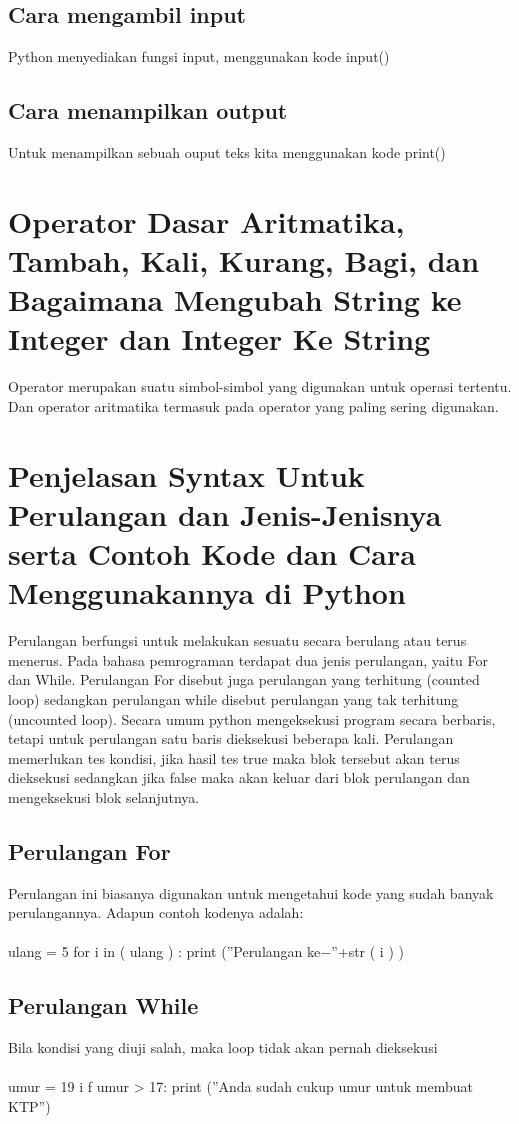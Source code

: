 \documentclass{article}
\begin{document}
\subsection{Cara mengambil input}
Python menyediakan fungsi input, menggunakan kode input()
\subsection{Cara menampilkan output}
Untuk menampilkan sebuah ouput teks kita menggunakan kode print()
\section{Operator Dasar Aritmatika, Tambah, Kali, Kurang, Bagi, dan Bagaimana Mengubah String ke Integer dan Integer Ke String}
Operator merupakan suatu simbol-simbol yang digunakan untuk operasi tertentu. Dan operator aritmatika termasuk pada operator yang paling sering digunakan.
\section{Penjelasan Syntax Untuk Perulangan dan Jenis-Jenisnya serta Contoh Kode dan Cara Menggunakannya di Python}
Perulangan berfungsi untuk melakukan sesuatu secara berulang atau terus menerus. Pada bahasa pemrograman terdapat dua jenis perulangan, yaitu For dan While. Perulangan For disebut juga perulangan yang terhitung (counted loop) sedangkan perulangan while disebut perulangan yang tak terhitung (uncounted loop). Secara umum python mengeksekusi program secara berbaris, tetapi untuk perulangan satu baris dieksekusi beberapa kali. Perulangan memerlukan tes kondisi, jika hasil tes true maka blok tersebut akan terus dieksekusi sedangkan jika false maka akan keluar dari blok perulangan dan mengeksekusi blok selanjutnya.
\subsection{Perulangan For}
Perulangan ini biasanya digunakan untuk mengetahui kode yang sudah banyak perulangannya. Adapun contoh kodenya adalah:\\
\\
ulang = 5
 for i in ( ulang ) : 
 print (”Perulangan ke−”+str ( i ) )
\subsection{Perulangan While}
Bila kondisi yang diuji salah, maka loop tidak akan pernah dieksekusi\\
\\
 umur = 19 
 i f umur > 17: 
 print (”Anda sudah cukup umur untuk membuat KTP”)
\end{document}
